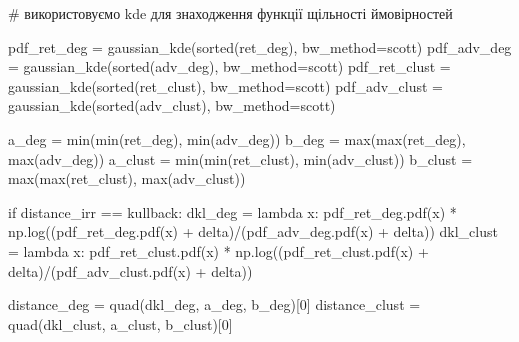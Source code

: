 \documentclass[
  letterpaper,
]{report}
\newenvironment{Shaded}{\begin{snugshade}}{\end{snugshade}}
\newcommand{\BuiltInTok}[1]{\textcolor[rgb]{0.00,0.23,0.31}{#1}}
\newcommand{\CommentTok}[1]{\textcolor[rgb]{0.37,0.37,0.37}{#1}}
\newcommand{\ControlFlowTok}[1]{\textcolor[rgb]{0.00,0.23,0.31}{#1}}
\newcommand{\DecValTok}[1]{\textcolor[rgb]{0.68,0.00,0.00}{#1}}
\newcommand{\KeywordTok}[1]{\textcolor[rgb]{0.00,0.23,0.31}{#1}}
\newcommand{\NormalTok}[1]{\textcolor[rgb]{0.00,0.23,0.31}{#1}}
\newcommand{\OperatorTok}[1]{\textcolor[rgb]{0.37,0.37,0.37}{#1}}
\newcommand{\StringTok}[1]{\textcolor[rgb]{0.13,0.47,0.30}{#1}}
\begin{document}
\begin{Shaded}
\begin{Highlighting}[]
    \CommentTok{\# використовуємо kde для знаходження функції щільності ймовірностей }
    
\NormalTok{    pdf\_ret\_deg }\OperatorTok{=}\NormalTok{ gaussian\_kde(}\BuiltInTok{sorted}\NormalTok{(ret\_deg), bw\_method}\OperatorTok{=}\StringTok{\textquotesingle{}scott\textquotesingle{}}\NormalTok{)       }
\NormalTok{    pdf\_adv\_deg }\OperatorTok{=}\NormalTok{ gaussian\_kde(}\BuiltInTok{sorted}\NormalTok{(adv\_deg), bw\_method}\OperatorTok{=}\StringTok{\textquotesingle{}scott\textquotesingle{}}\NormalTok{)    }
\NormalTok{    pdf\_ret\_clust }\OperatorTok{=}\NormalTok{ gaussian\_kde(}\BuiltInTok{sorted}\NormalTok{(ret\_clust), bw\_method}\OperatorTok{=}\StringTok{\textquotesingle{}scott\textquotesingle{}}\NormalTok{)    }
\NormalTok{    pdf\_adv\_clust }\OperatorTok{=}\NormalTok{ gaussian\_kde(}\BuiltInTok{sorted}\NormalTok{(adv\_clust), bw\_method}\OperatorTok{=}\StringTok{\textquotesingle{}scott\textquotesingle{}}\NormalTok{)}
    
\NormalTok{    a\_deg }\OperatorTok{=} \BuiltInTok{min}\NormalTok{(}\BuiltInTok{min}\NormalTok{(ret\_deg), }\BuiltInTok{min}\NormalTok{(adv\_deg))  }
\NormalTok{    b\_deg }\OperatorTok{=} \BuiltInTok{max}\NormalTok{(}\BuiltInTok{max}\NormalTok{(ret\_deg), }\BuiltInTok{max}\NormalTok{(adv\_deg))  }
\NormalTok{    a\_clust }\OperatorTok{=} \BuiltInTok{min}\NormalTok{(}\BuiltInTok{min}\NormalTok{(ret\_clust), }\BuiltInTok{min}\NormalTok{(adv\_clust))}
\NormalTok{    b\_clust }\OperatorTok{=} \BuiltInTok{max}\NormalTok{(}\BuiltInTok{max}\NormalTok{(ret\_clust), }\BuiltInTok{max}\NormalTok{(adv\_clust))}
                           
    \ControlFlowTok{if}\NormalTok{ distance\_irr }\OperatorTok{==} \StringTok{\textquotesingle{}kullback\textquotesingle{}}\NormalTok{:}
\NormalTok{        dkl\_deg }\OperatorTok{=} \KeywordTok{lambda}\NormalTok{ x: pdf\_ret\_deg.pdf(x) }\OperatorTok{*}\NormalTok{ np.log((pdf\_ret\_deg.pdf(x) }\OperatorTok{+}\NormalTok{ delta)}\OperatorTok{/}\NormalTok{(pdf\_adv\_deg.pdf(x) }\OperatorTok{+}\NormalTok{ delta))        }
\NormalTok{        dkl\_clust }\OperatorTok{=} \KeywordTok{lambda}\NormalTok{ x: pdf\_ret\_clust.pdf(x) }\OperatorTok{*}\NormalTok{ np.log((pdf\_ret\_clust.pdf(x) }\OperatorTok{+}\NormalTok{ delta)}\OperatorTok{/}\NormalTok{(pdf\_adv\_clust.pdf(x) }\OperatorTok{+}\NormalTok{ delta))}

\NormalTok{        distance\_deg }\OperatorTok{=}\NormalTok{ quad(dkl\_deg, a\_deg, b\_deg)[}\DecValTok{0}\NormalTok{]       }
\NormalTok{        distance\_clust }\OperatorTok{=}\NormalTok{ quad(dkl\_clust, a\_clust, b\_clust)[}\DecValTok{0}\NormalTok{]}
    

\end{Highlighting}
\end{Shaded}
\end{document}
